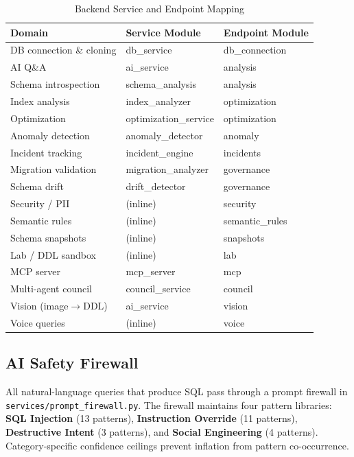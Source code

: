 \documentclass[12pt,a4paper]{report}
\begin{document}
\begin{table}[htbp]
\caption{Backend Service and Endpoint Mapping}
\label{tab:services}
\centering
\begin{tabular}{>{\raggedright}p{4cm} >{\raggedright}p{3.5cm} >{\raggedright\arraybackslash}p{3.5cm}}
\toprule
\textbf{Domain} & \textbf{Service Module} & \textbf{Endpoint Module} \\
\midrule
DB connection \& cloning  & db\_service           & db\_connection \\
AI Q\&A                   & ai\_service           & analysis \\
Schema introspection      & schema\_analysis      & analysis \\
Index analysis            & index\_analyzer       & optimization \\
Optimization              & optimization\_service & optimization \\
Anomaly detection         & anomaly\_detector     & anomaly \\
Incident tracking         & incident\_engine      & incidents \\
Migration validation      & migration\_analyzer   & governance \\
Schema drift              & drift\_detector       & governance \\
Security / PII            & (inline)              & security \\
Semantic rules            & (inline)              & semantic\_rules \\
Schema snapshots          & (inline)              & snapshots \\
Lab / DDL sandbox         & (inline)              & lab \\
MCP server                & mcp\_server           & mcp \\
Multi-agent council       & council\_service      & council \\
Vision (image$\to$DDL)   & ai\_service           & vision \\
Voice queries             & (inline)              & voice \\
\bottomrule
\end{tabular}
\end{table}

\subsection{AI Safety Firewall}

All natural-language queries that produce SQL pass through a prompt firewall in \texttt{services/prompt\_firewall.py}. The firewall maintains four pattern libraries: \textbf{SQL Injection} (13 patterns), \textbf{Instruction Override} (11 patterns), \textbf{Destructive Intent} (3 patterns), and \textbf{Social Engineering} (4 patterns). Category-specific confidence ceilings prevent inflation from pattern co-occurrence.
\end{document}
